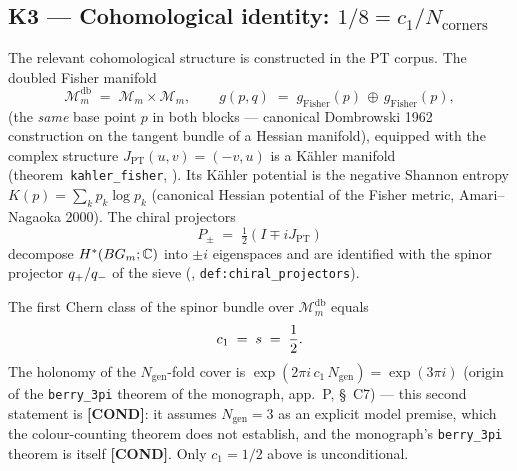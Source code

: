 \subsection{K3 --- Cohomological identity: $1/8 = c_1/N_{\mathrm{corners}}$}
\label{sec:K3}

The relevant cohomological structure is constructed in the PT corpus.
The doubled Fisher manifold
\begin{equation}
\mathcal{M}_m^{\mathrm{db}} \;=\; \mathcal{M}_m \times \mathcal{M}_m, \qquad
g(p,q) \;=\; g_{\mathrm{Fisher}}(p) \,\oplus\, g_{\mathrm{Fisher}}(p),
\label{eq:Mdoub}
\end{equation}
(the \emph{same} base point $p$ in both blocks --- canonical
Dombrowski 1962 construction on the tangent bundle of a Hessian
manifold), equipped with the complex structure $J_{\mathrm{PT}}(u, v) = (-v, u)$
is a K\"ahler manifold (theorem~\texttt{kahler\_fisher},
\cite{PT_M5}). Its K\"ahler potential is the negative Shannon
entropy $K(p) = \sum_k p_k \log p_k$ (canonical Hessian potential of
the Fisher metric, Amari--Nagaoka 2000). The chiral projectors
\begin{equation}
P_{\pm} \;=\; \tfrac{1}{2}(I \mp i J_{\mathrm{PT}})
\label{eq:Pchir}
\end{equation}
decompose $H^{*}(BG_m; \mathbb{C})$ into $\pm i$ eigenspaces and are
identified with the spinor projector $q_{+}/q_{-}$ of the sieve
(\cite{PT_M5}, \texttt{def:chiral\_projectors}).

\begin{theoreme}
\label{thm:berry_3pi}
The first Chern class of the spinor bundle over
$\mathcal{M}_m^{\mathrm{db}}$ equals
\begin{equation}
c_1 \;=\; s \;=\; \dfrac{1}{2}.
\label{eq:c1}
\end{equation}
The holonomy of the $N_{\mathrm{gen}}$-fold cover is
$\exp(2\pi i\,c_1\,N_{\mathrm{gen}}) = \exp(3\pi i)$ (origin of the
\texttt{berry\_3pi} theorem of the monograph, app.~P, \S~C7) --- this
second statement is \textbf{[COND]}: it assumes $N_{\mathrm{gen}} = 3$
as an explicit model premise, which the colour-counting theorem does not
establish, and the monograph's \texttt{berry\_3pi} theorem is itself
\textbf{[COND]}. Only $c_1 = 1/2$ above is unconditional.
\end{theoreme}

